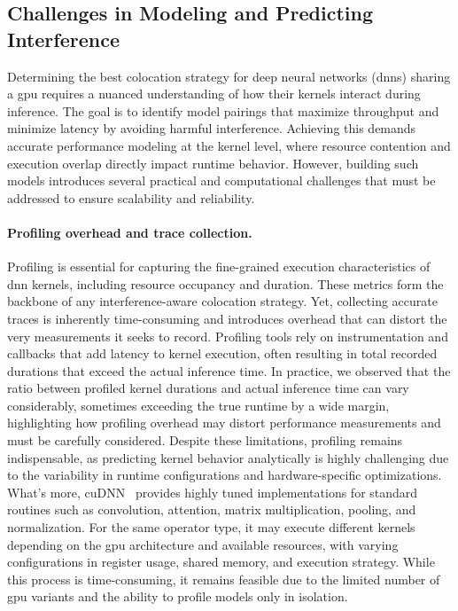 \subsection{Challenges in Modeling and Predicting Interference}

Determining the best colocation strategy for deep neural networks (\acrshort{dnn}s) sharing a \acrshort{gpu} requires a nuanced understanding of how their kernels interact during inference. The goal is to identify model pairings that maximize throughput and minimize latency by avoiding harmful interference. Achieving this demands accurate performance modeling at the kernel level, where resource contention and execution overlap directly impact runtime behavior. However, building such models introduces several practical and computational challenges that must be addressed to ensure scalability and reliability.

\paragraph{Profiling overhead and trace collection.}
Profiling is essential for capturing the fine-grained execution characteristics of \acrshort{dnn} kernels, including resource occupancy and duration. These metrics form the backbone of any interference-aware colocation strategy. Yet, collecting accurate traces is inherently time-consuming and introduces overhead that can distort the very measurements it seeks to record. Profiling tools rely on instrumentation and callbacks that add latency to kernel execution, often resulting in total recorded durations that exceed the actual inference time.
In practice, we observed that the ratio between profiled kernel durations and actual inference time can vary considerably, sometimes exceeding the true runtime by a wide margin, highlighting how profiling overhead may distort performance measurements and must be carefully considered.
Despite these limitations, profiling remains indispensable, as predicting kernel behavior analytically is highly challenging due to the variability in runtime configurations and hardware-specific optimizations. What's more, cuDNN~\cite{cudnn} provides highly tuned implementations for standard routines such as convolution, attention, matrix multiplication, pooling, and normalization. For the same operator type, it may execute different kernels depending on the \acrshort{gpu} architecture and available resources, with varying configurations in register usage, shared memory, and execution strategy. While this process is time-consuming, it remains feasible due to the limited number of \acrshort{gpu} variants and the ability to profile models only in isolation.

